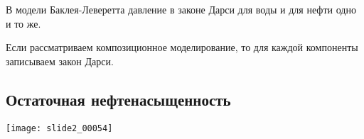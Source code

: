 \documentclass[main.tex]{subfiles}
\begin{document}
В модели Баклея-Леверетта давление в законе Дарси для воды и для нефти одно и то же.

Если рассматриваем композиционное моделирование, то для каждой компоненты записываем закон Дарси.




\subsection{Остаточная нефтенасыщенность}

\texttt{[image: slide2\_00054]}






\end{document}
